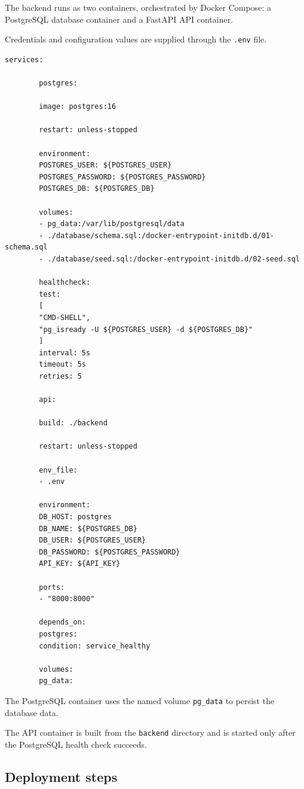 \documentclass[10pt,a4paper]{article}
\begin{document}
	The backend runs as two containers, orchestrated by Docker Compose:
	a PostgreSQL database container and a FastAPI API container.
	
	Credentials and configuration values are supplied through the
	\texttt{.env} file.
	
	\begin{lstlisting}[caption={docker-compose.yml (excerpt)}]
		services:
		
		postgres:
		
		image: postgres:16
		
		restart: unless-stopped
		
		environment:
		POSTGRES_USER: ${POSTGRES_USER}
		POSTGRES_PASSWORD: ${POSTGRES_PASSWORD}
		POSTGRES_DB: ${POSTGRES_DB}
		
		volumes:
		- pg_data:/var/lib/postgresql/data
		- ./database/schema.sql:/docker-entrypoint-initdb.d/01-schema.sql
		- ./database/seed.sql:/docker-entrypoint-initdb.d/02-seed.sql
		
		healthcheck:
		test:
		[
		"CMD-SHELL",
		"pg_isready -U ${POSTGRES_USER} -d ${POSTGRES_DB}"
		]
		interval: 5s
		timeout: 5s
		retries: 5
		
		api:
		
		build: ./backend
		
		restart: unless-stopped
		
		env_file:
		- .env
		
		environment:
		DB_HOST: postgres
		DB_NAME: ${POSTGRES_DB}
		DB_USER: ${POSTGRES_USER}
		DB_PASSWORD: ${POSTGRES_PASSWORD}
		API_KEY: ${API_KEY}
		
		ports:
		- "8000:8000"
		
		depends_on:
		postgres:
		condition: service_healthy
		
		volumes:
		pg_data:
	\end{lstlisting}
	
	The PostgreSQL container uses the named volume
	\texttt{pg\_data} to persist the database data.
	
	The API container is built from the \texttt{backend} directory and
	is started only after the PostgreSQL health check succeeds.
	
	\subsection*{Deployment steps}
	
\end{document}

